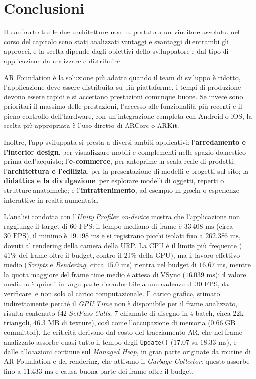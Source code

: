 \chapter{Conclusioni}
Il confronto tra le due architetture non ha portato a un vincitore assoluto: nel corso del capitolo sono stati analizzati vantaggi e svantaggi di entrambi gli approcci, e la scelta dipende dagli obiettivi dello sviluppatore e dal tipo di applicazione da realizzare e distribuire.

AR Foundation è la soluzione più adatta quando il team di sviluppo è ridotto, l’applicazione deve essere distribuita su più piattaforme, i tempi di produzione devono essere rapidi e si accettano prestazioni comunque buone. Se invece sono prioritari il massimo delle prestazioni, l’accesso alle funzionalità più recenti e il pieno controllo dell’hardware, con un’integrazione completa con Android o iOS, la scelta più appropriata è l’uso diretto di ARCore o ARKit. \newline

 Inoltre, l'app sviluppata si presta a diversi ambiti applicativi: l'\textbf{arredamento e l'interior design}, per visualizzare mobili e complementi nello spazio domestico prima dell'acquisto; l'\textbf{e-commerce}, per anteprime in scala reale di prodotti; l'\textbf{architettura e l'edilizia}, per la presentazione di modelli e progetti sul sito; la \textbf{didattica e la divulgazione}, per esplorare modelli di oggetti, reperti o strutture anatomiche; e l'\textbf{intrattenimento}, ad esempio in giochi o esperienze interattive in realtà aumentata.
 
 L'analisi condotta con l'\textit{Unity Profiler} \textit{on-device} mostra che l'applicazione non raggiunge il target di $60\text{ FPS}$: il tempo mediano di frame è $33.408\text{ ms}$ (circa $30\text{ FPS}$), il minimo è $19.198\text{ ms}$ e si registrano picchi isolati fino a $262.386\text{ ms}$, dovuti al rendering della camera della URP. La CPU è il limite più frequente ($41\%$ dei frame oltre il budget, contro il $20\%$ della GPU), ma il lavoro effettivo medio (\textit{Scripts} e \textit{Rendering}, circa $15.0\text{ ms}$) rientra nel budget di $16.67\text{ ms}$, mentre la quota maggiore del frame time medio è attesa di VSync ($16.039\text{ ms}$): il valore mediano è quindi in larga parte riconducibile a una cadenza di $30\text{ FPS}$, da verificare, e non solo al carico computazionale. Il carico grafico, stimato indirettamente perché il \textit{GPU Time} non è disponibile per il frame analizzato, risulta contenuto ($42$ \textit{SetPass Calls}, $7$ chiamate di disegno in $4$ batch, circa $22\text{k}$ triangoli, $46.3\text{ MB}$ di texture), così come l'occupazione di memoria ($0.66\text{ GB}$ committed). Le criticità derivano dal costo del tracciamento AR, che nel frame analizzato assorbe quasi tutto il tempo degli \texttt{Update()} ($17.07$ su $18.33\text{ ms}$), e dalle allocazioni continue sul \textit{Managed Heap}, in gran parte originate da routine di AR Foundation e del rendering, che attivano il \textit{Garbage Collector}: questo assorbe fino a $11.433\text{ ms}$ e causa buona parte dei frame oltre il budget. 
 \newline
 
